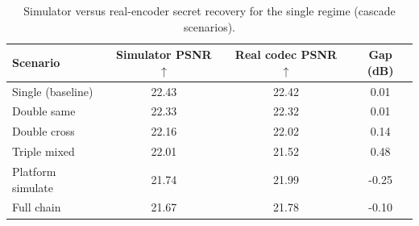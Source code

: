 \begin{table}[t]
\centering
\caption{Simulator versus real-encoder secret recovery for the single regime (cascade scenarios).}
\label{tab:single-cascade-gap}
\begin{tabular}{lccc}
\toprule
Scenario & Simulator PSNR $\uparrow$ & Real codec PSNR $\uparrow$ & Gap (dB) \\
\midrule
Single (baseline) & 22.43 & 22.42 & 0.01 \\
Double same & 22.33 & 22.32 & 0.01 \\
Double cross & 22.16 & 22.02 & 0.14 \\
Triple mixed & 22.01 & 21.52 & 0.48 \\
Platform simulate & 21.74 & 21.99 & -0.25 \\
Full chain & 21.67 & 21.78 & -0.10 \\
\bottomrule
\end{tabular}
\end{table}
